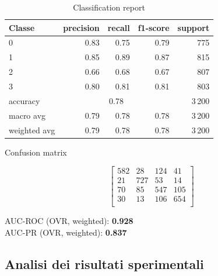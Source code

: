 \documentclass[a4paper,12pt]{report}
\begin{document}
	\begin{table}[H]
		\centering
		\caption{Classification report}
		\label{tab:cr_cnn_kan}
		\begin{tabular}{lrrrr}
			\toprule
			Classe & precision & recall & f1-score & support \\
			\midrule
			0 & 0.83 & 0.75 & 0.79 & 775 \\
			1 & 0.85 & 0.89 & 0.87 & 815 \\
			2 & 0.66 & 0.68 & 0.67 & 807 \\
			3 & 0.80 & 0.81 & 0.81 & 803 \\
			\midrule
			accuracy & \multicolumn{3}{c}{0.78} & 3\,200 \\
			macro avg & 0.79 & 0.78 & 0.78 & 3\,200 \\
			weighted avg & 0.79 & 0.78 & 0.78 & 3\,200 \\
			\bottomrule
		\end{tabular}
	\end{table}
	
	\begin{table}[H]
		\centering
		\caption{Confusion matrix}
		\label{tab:cm_cnn_kan}
		\[
		\begin{bmatrix}
			582 & 28  & 124 & 41  \\
			21  & 727 & 53  & 14  \\
			70  & 85  & 547 & 105 \\
			30  & 13  & 106 & 654 \\
		\end{bmatrix}
		\]
		\vspace{1mm}
		
		AUC-ROC (OVR, weighted): \textbf{0.928} \\
		AUC-PR  (OVR, weighted): \textbf{0.837}
	\end{table}
	
	\subsection{Analisi dei risultati sperimentali}
	
\end{document}
